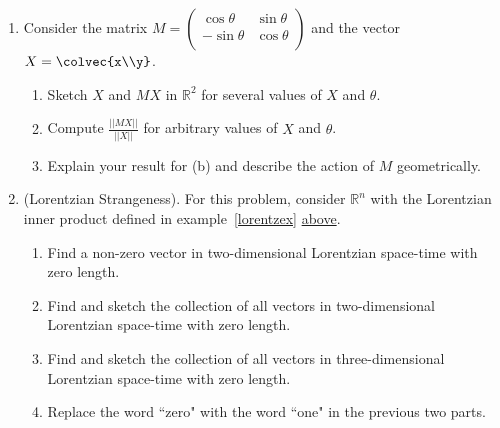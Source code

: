 \begin{enumerate}
\item\label{rotate}\hypertarget{rotationprob}{Consider} the matrix 
$M = \begin{pmatrix}
\cos \theta & \sin \theta \\
-\sin \theta & \cos \theta \\
\end{pmatrix}
$ and the vector $X = \colvec{x\\y}$.
\begin{enumerate}
	\item Sketch $X$ and $MX$ in $\mathbb{R}^2$ for several values of $X$ and $\theta$.
	\item Compute $\frac{||MX||}{||X||}$ for arbitrary values of $X$ and $\theta$.
	\item Explain your result for (b) and describe the action of $M$ geometrically.
\end{enumerate}



\item \label{lorentz}(Lorentzian Strangeness).  For this problem, consider $\mathbb{R}^n$ with the Lorentzian inner product  defined in example~\ref{lorentzex} \hyperlink{lorentzian_metric}{above}. 
\begin{enumerate}
	\item Find a non-zero vector in two-dimensional Lorentzian space-time with zero length.

	\item Find and sketch the collection of all vectors in two-dimensional Lorentzian space-time with zero length.

	\item Find and sketch the collection of all vectors in three-dimensional Lorentzian space-time with zero length. 
	\item Replace the word ``zero" with the word ``one" in the previous two parts. 
\end{enumerate}


\end{enumerate}
